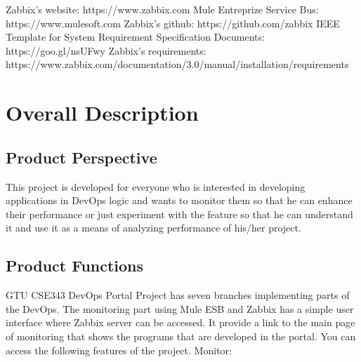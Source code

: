 \documentclass{article}
\begin{document}
Zabbix’s website:  
https://www.zabbix.com
\newline
Mule Entreprize Service Bus:
https://www.mulesoft.com
\newline
Zabbix’s github:
https://github.com/zabbix
\newline
IEEE Template for System Requirement Specification Documents:
https://goo.gl/nsUFwy
\newline
Zabbix’s requirements:
https://www.zabbix.com/documentation/3.0/manual/installation/requirements

\section{Overall Description}

    \subsection{Product Perspective}

     This project  is developed for everyone who is interested in developing applications in DevOps logic and wants to monitor them so that he can enhance their performance or just experiment with the feature so that he can understand it and use it as a means of analyzing performance of his/her project.

\subsection{Product Functions}

	GTU CSE343 DevOps Portal Project has seven branches implementing  parts of the DevOps. The  monitoring part using Mule ESB and Zabbix has a simple user interface where Zabbix server can be accessed. It provide a link to the main page of monitoring that shows the programs that are developed in the portal. You can access the following features of the project.
\flushleft
Monitor:
\end{document}
